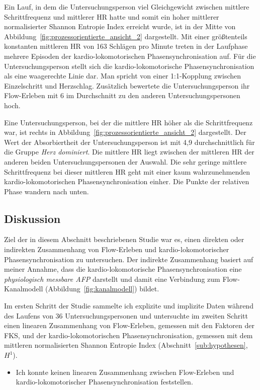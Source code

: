 Ein Lauf, in dem die Untersuchungsperson viel Gleichgewicht zwischen mittlere Schrittfrequenz und mittlerer \ac{HR} hatte und somit ein hoher mittlerer normalisierter Shannon Entropie Index erreicht wurde, ist in der Mitte von Abbildung~\ref{fig:prozessorientierte_ansicht_2} dargestellt. Mit einer größtenteils konstanten mittleren \ac{HR} von 163 Schlägen pro Minute treten in der Laufphase mehrere Episoden der kardio-lokomotorischen Phasensynchronisation auf. Für die Untersuchungsperson stellt sich die kardio-lokomotorische Phasensynchronisation als eine waagerechte Linie dar. Man spricht von einer 1:1-Kopplung zwischen Einzelschritt und Herzschlag. Zusätzlich bewertete die Untersuchungsperson ihr Flow-Erleben mit 6 im Durchschnitt zu den anderen Untersuchungspersonen hoch. 

Eine Untersuchungsperson, bei der die mittlere \ac{HR} höher als die Schrittfrequenz war, ist rechts in Abbildung~\ref{fig:prozessorientierte_ansicht_2} dargestellt. Der Wert der Absorbiertheit der Untersuchungsperson ist mit 4,9 durchschnittlich für die Gruppe \emph{Herz dominiert}. Die mittlere \ac{HR} liegt zwischen der mittleren \ac{HR} der anderen beiden Untersuchungspersonen der Auswahl. Die sehr geringe mittlere Schrittfrequenz bei dieser mittleren \ac{HR} geht mit einer kaum wahrzunehmenden kardio-lokomotorischen Phasensynchronisation einher. Die Punkte der relativen Phase wandern nach unten. 

\subsection{Diskussion} 

\label{sub:diskussion_5_3}

Ziel der in diesem Abschnitt beschriebenen Studie war es, einen direkten oder indirekten Zusammenhang von Flow-Erleben und kardio-lokomotorischer Phasensynchronisation zu untersuchen. Der indirekte Zusammenhang basiert auf meiner Annahme, dass die kardio-lokomotorische Phasensynchronisation eine \emph{physiologisch messbare \ac{AFP}} darstellt und damit eine Verbindung zum Flow-Kanalmodell (Abbildung~\ref{fig:kanalmodell}) bildet. 

Im ersten Schritt der Studie sammelte ich explizite und implizite Daten während des Laufens von 36 Untersuchungspersonen und untersuchte im zweiten Schritt einen linearen Zusammenhang von Flow-Erleben, gemessen mit den Faktoren der \ac{FKS}, und der kardio-lokomotorischen Phasensynchronisation, gemessen mit dem mittleren normalisierten Shannon Entropie Index (Abschnitt~\ref{sub:hypothesen}, $H^1$). 
\begin{itemize}
	
	\item Ich konnte keinen linearen Zusammenhang zwischen Flow-Erleben und kardio-lokomotorischer Phasensynchronisation feststellen.
\end{itemize}

